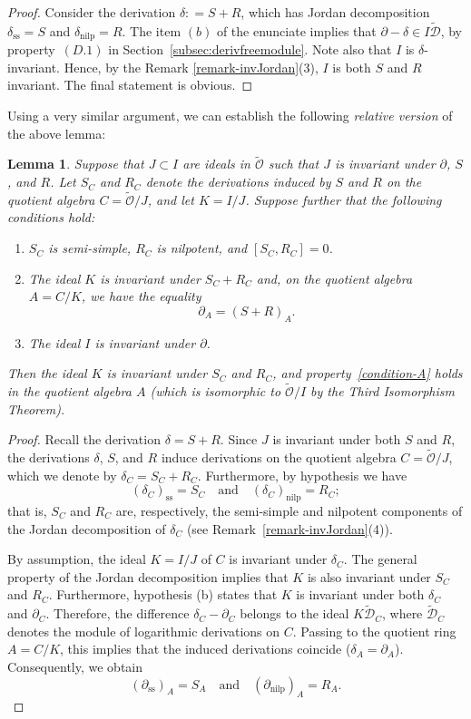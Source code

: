 \documentclass[10pt,twoside,reqno]{amsart}
\newtheorem{lemma}[thm]{Lemma}
\theoremstyle{remark}
\theoremstyle{remark}
\newcommand{\tmop}[1]{{\operatorname{#1}}}
\newenvironment{enumeratealpha}{\begin{enumerate}[a{\textup{)}}] }{\end{enumerate}}
\newcommand{\tO}{\widetilde{\mathcal{O}}}
\newcommand{\cD}{\mathcal{D}}
\newcommand{\tcD}{\widetilde{\cD}}
\begin{document}
\begin{proof}
  Consider the derivation $\delta : = S + R$, which has Jordan decomposition
  $\delta_{\tmop{ss}} = S$ and $\delta_{\tmop{nilp}} = R$. The item $(b)$ of the enunciate
  implies that $\partial - \delta \in I \tcD$, by property~$(D.1)$ in Section~\ref{subsec:derivfreemodule}. Note also that $I$ is
  $\delta$-invariant. Hence, by the Remark \ref{remark-invJordan}(3), $I$ is both
  $S$ and $R$ invariant. The final statement is obvious. 
\end{proof}
Using a very similar argument, we can establish the following {\em relative version} of the above lemma:
\begin{lemma}\label{Lemma-relative-version}
Suppose that $J \subset I$ are ideals in $\tO$ such that $J$ is invariant under $\partial$, $S$, and $R$. Let $S_C$ and $R_C$ denote the derivations induced by $S$ and $R$ on the quotient algebra $C = \tO / J$, and let $K = I/J$. Suppose further that the following conditions hold:
\begin{enumeratealpha}
  \item $S_C$ is semi-simple, $R_C$ is nilpotent, and $[S_C, R_C] = 0$.
  \item The ideal $K$ is invariant under $S_C + R_C$ and, on the quotient algebra $A = C/K$, we have the equality
  \[ \partial_A = (S + R)_A. \]
  \item The ideal $I$ is invariant under $\partial$.
\end{enumeratealpha}
Then the ideal $K$ is invariant under $S_C$ and $R_C$, and property~\eqref{condition-A} holds in the quotient algebra $A$ (which is isomorphic to $\tO / I$ by the Third Isomorphism Theorem).
\end{lemma}
\begin{proof}
Recall the derivation $\delta = S + R$. Since $J$ is invariant under both $S$ and $R$, the derivations $\delta$, $S$, and $R$ induce derivations on the quotient algebra $C = \tO / J$, which we denote by $\delta_C = S_C + R_C$. Furthermore, by hypothesis we have
$$
(\delta_C)_{\tmop{ss}} = S_C \quad \text{and} \quad (\delta_C)_{\tmop{nilp}} = R_C;
$$
that is, $S_C$ and $R_C$ are, respectively, the semi-simple and nilpotent components of the Jordan decomposition of $\delta_C$ (see Remark~\ref{remark-invJordan}(4)).

By assumption, the ideal $K = I/J$ of $C$ is invariant under $\delta_C$. The general property of the Jordan decomposition implies that $K$ is also invariant under $S_C$ and $R_C$. Furthermore, hypothesis (b) states that $K$ is invariant under both $\delta_C$ and $\partial_C$. Therefore, the difference $\delta_C - \partial_C$ belongs to the ideal $K \tcD_C$, where $\tcD_C$ denotes the module of logarithmic derivations on $C$. Passing to the quotient ring $A = C/K$, this implies that the induced derivations coincide ($\delta_A = \partial_A$). Consequently, we obtain
$$
(\partial_{\tmop{ss}})_A = S_A \quad \text{and} \quad (\partial_{\tmop{nilp}})_A = R_A.
$$
\end{proof}
\end{document}

